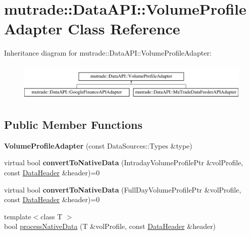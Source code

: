\hypertarget{classmutrade_1_1_data_a_p_i_1_1_volume_profile_adapter}{\section{mutrade\-:\-:Data\-A\-P\-I\-:\-:Volume\-Profile\-Adapter Class Reference}
\label{classmutrade_1_1_data_a_p_i_1_1_volume_profile_adapter}
}
Inheritance diagram for mutrade\-:\-:Data\-A\-P\-I\-:\-:Volume\-Profile\-Adapter\-:\begin{figure}[H]
\begin{center}
\leavevmode
\includegraphics[height=1.830065cm]{classmutrade_1_1_data_a_p_i_1_1_volume_profile_adapter}
\end{center}
\end{figure}
\subsection*{Public Member Functions}
\begin{DoxyCompactItemize}
\item 
\hypertarget{classmutrade_1_1_data_a_p_i_1_1_volume_profile_adapter_ac8c8e7690ed572254e2dfbaa344a46c9}{{\bfseries Volume\-Profile\-Adapter} (const Data\-Sources\-::\-Types \&type)}\label{classmutrade_1_1_data_a_p_i_1_1_volume_profile_adapter_ac8c8e7690ed572254e2dfbaa344a46c9}

\item 
\hypertarget{classmutrade_1_1_data_a_p_i_1_1_volume_profile_adapter_aad9b352c1950b1b690a8a0c6b7e00f52}{virtual bool {\bfseries convert\-To\-Native\-Data} (Intraday\-Volume\-Profile\-Ptr \&vol\-Profile, const \hyperlink{structmutrade_1_1_data_a_p_i_1_1_data_header}{Data\-Header} \&header)=0}\label{classmutrade_1_1_data_a_p_i_1_1_volume_profile_adapter_aad9b352c1950b1b690a8a0c6b7e00f52}

\item 
\hypertarget{classmutrade_1_1_data_a_p_i_1_1_volume_profile_adapter_ab97370f561d64352334749940d768e69}{virtual bool {\bfseries convert\-To\-Native\-Data} (Full\-Day\-Volume\-Profile\-Ptr \&vol\-Profile, const \hyperlink{structmutrade_1_1_data_a_p_i_1_1_data_header}{Data\-Header} \&header)=0}\label{classmutrade_1_1_data_a_p_i_1_1_volume_profile_adapter_ab97370f561d64352334749940d768e69}

\item 
{\footnotesize template$<$class T $>$ }\\bool \hyperlink{classmutrade_1_1_data_a_p_i_1_1_volume_profile_adapter_aceff8a2bed534a885240ed15224a1c03}{process\-Native\-Data} (T \&vol\-Profile, const \hyperlink{structmutrade_1_1_data_a_p_i_1_1_data_header}{Data\-Header} \&header)
\end{DoxyCompactItemize}
